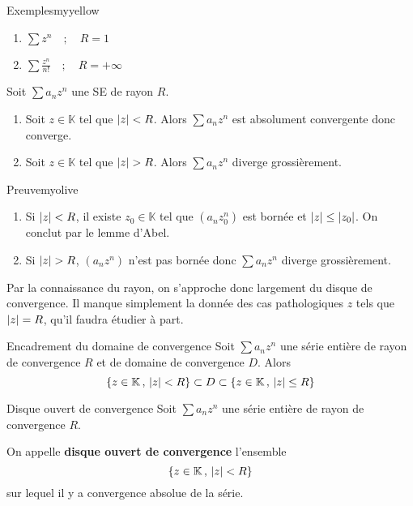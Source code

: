     \begin{omed}{Exemples}{myyellow}
        \begin{enumerate}[label=\textcolor{myyellow}{\arabic*.}]
            \item $\sum z^n \quad ; \quad R = 1$
            \item $\sum \frac{z^n}{n!} \quad ; \quad R = +\infty$
        \end{enumerate}
    \end{omed}

    \begin{prop}{}{}
        Soit $\sum a_n z^n$ une SE de rayon $R$.
        \begin{enumerate}
            \item Soit $z \in \mathbb{K}$ tel que $\left\lvert z\right\rvert < R$. Alors $\sum a_n z^n$ est absolument convergente donc converge.
            \item Soit $z \in \mathbb{K}$ tel que $\left\lvert z\right\rvert > R$. Alors $\sum a_n z^n$ diverge grossièrement.
        \end{enumerate}
    \end{prop}

    \begin{demo}{Preuve}{myolive}
        \begin{enumerate}
            \item Si $\left\lvert z\right\rvert < R$, il existe $z_0 \in \mathbb{K}$ tel que $(a_n z_0^n)$ est bornée et $\left\lvert z\right\rvert \leq \left\lvert z_0\right\rvert$. On conclut par le lemme d’Abel.
            \item Si $\left\lvert z\right\rvert > R$, $(a_n z^n)$ n’est pas bornée donc $\sum a_n z^n$ diverge grossièrement.
        \end{enumerate}
    \end{demo}

    Par la connaissance du rayon, on s’approche donc largement du disque de convergence. Il manque simplement la donnée des cas pathologiques $z$ tels que $\left\lvert z\right\rvert = R$, qu’il faudra étudier à part.

    \begin{coro}{Encadrement du domaine de convergence}{}
        Soit $\sum a_n z^n$ une série entière de rayon de convergence $R$ et de domaine de convergence $D$. Alors 
        \[ \left\{ z \in \mathbb{K} \, , \, \left\lvert z\right\rvert < R \right\} \subset D \subset \left\{ z \in \mathbb{K} \, , \, \left\lvert z\right\rvert \leq R \right\} \]
    \end{coro}

    \begin{defi}{Disque ouvert de convergence}{}
        Soit $\sum a_n z^n$ une série entière de rayon de convergence $R$.

        On appelle \textbf{disque ouvert de convergence} l’ensemble 
        \[ \left\{ z \in \mathbb{K} \, , \, \left\lvert z\right\rvert < R \right\} \] 
        sur lequel il y a convergence absolue de la série.
    \end{defi}

